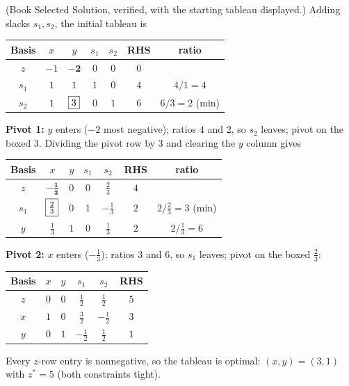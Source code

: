 
(Book Selected Solution, verified, with the starting tableau displayed.)
Adding slacks $s_1, s_2$, the initial tableau is
\begin{center}
\renewcommand{\arraystretch}{1.3}
\begin{tabular}{c|cccc|c|c}
Basis & $x$ & $y$ & $s_1$ & $s_2$ & RHS & ratio\\
\hline
$z$   & $-1$ & $\mathbf{-2}$ & $0$ & $0$ & $0$ & \\
\hline
$s_1$ & $1$ & $1$ & $1$ & $0$ & $4$ & $4/1 = 4$\\
$s_2$ & $1$ & $\fbox{3}$ & $0$ & $1$ & $6$ & $6/3 = 2$ (min)\\
\end{tabular}
\end{center}

\textbf{Pivot 1:} $y$ enters ($-2$ most negative); ratios $4$ and $2$,
so $s_2$ leaves; pivot on the boxed $3$. Dividing the pivot row by $3$
and clearing the $y$ column gives
\begin{center}
\renewcommand{\arraystretch}{1.3}
\begin{tabular}{c|cccc|c|c}
Basis & $x$ & $y$ & $s_1$ & $s_2$ & RHS & ratio\\
\hline
$z$   & $\mathbf{-\tfrac13}$ & $0$ & $0$ & $\tfrac23$ & $4$ & \\
\hline
$s_1$ & $\fbox{$\tfrac23$}$ & $0$ & $1$ & $-\tfrac13$ & $2$ & $2/\tfrac23 = 3$ (min)\\
$y$   & $\tfrac13$ & $1$ & $0$ & $\tfrac13$  & $2$ & $2/\tfrac13 = 6$\\
\end{tabular}
\end{center}

\textbf{Pivot 2:} $x$ enters ($-\tfrac13$); ratios $3$ and $6$, so $s_1$
leaves; pivot on the boxed $\tfrac23$:
\begin{center}
\renewcommand{\arraystretch}{1.3}
\begin{tabular}{c|cccc|c}
Basis & $x$ & $y$ & $s_1$ & $s_2$ & RHS\\
\hline
$z$   & $0$ & $0$ & $\tfrac12$ & $\tfrac12$ & $5$\\
\hline
$x$ & $1$ & $0$ & $\tfrac32$  & $-\tfrac12$ & $3$\\
$y$ & $0$ & $1$ & $-\tfrac12$ & $\tfrac12$  & $1$\\
\end{tabular}
\end{center}
Every $z$-row entry is nonnegative, so the tableau is optimal:
$(x, y) = (3, 1)$ with $z^* = 5$ (both constraints tight).

